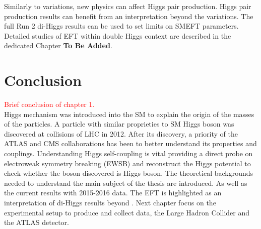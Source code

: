 Similarly to \kl variations, new physics can affect Higgs pair production. Higgs pair production results can benefit from an interpretation beyond the \kl variations. The full Run 2 di-Higgs results can be used to set limits on SMEFT parameters. Detailed studies of EFT within double Higgs context are described in the dedicated Chapter \textbf{To Be Added}.
\section{Conclusion}
\label{chap1:Conc}

\textcolor{red}{Brief conclusion of chapter 1.\\}
Higgs mechanism was introduced into the SM to explain the origin of the masses of the particles. A particle with similar proprieties to SM Higgs boson was discovered at collisions of LHC in 2012. After its discovery, a priority of the ATLAS and CMS collaborations has been to better understand its properties and couplings. Understanding Higgs self-coupling is vital providing a direct probe on electroweak symmetry breaking (EWSB) and reconstruct the Higgs potential to check whether the boson discovered is Higgs boson. The theoretical backgrounds needed to understand the main subject of the thesis are introduced. As well as the current results with 2015-2016 data. The EFT is highlighted as an interpretation of di-Higgs results beyond \kl. Next chapter focus on the experimental setup to produce and collect data, the Large Hadron Collider and the ATLAS detector. 

